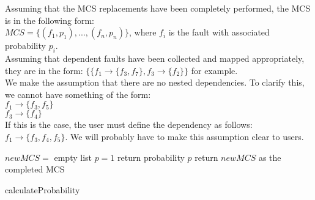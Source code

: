 Assuming that the MCS replacements have been completely performed, the MCS is in the following form: \\

$MCS = \{(f_1,p_1), ...,(f_n,p_n)\}$, where $f_i$ is the fault with associated probability $p_i$. \\

Assuming that dependent faults have been collected and mapped appropriately, they are in the form: $\{\{f_1 \rightarrow\{f_3, f_7\}, f_3 \rightarrow\{f_2\}\}$ for example. \\

We make the assumption that there are no nested dependencies. To clarify this, we cannot have something of the form: \\

$f_1 \rightarrow \{f_3, f_5\}$\\
$f_3 \rightarrow \{f_4\}$\\

If this is the case, the user must define the dependency as follows: $f_1 \rightarrow \{f_3, f_4, f_5\}$. We will probably have to make this assumption clear to users.\\ 

\begin{algorithm}[H]
	$newMCS =$ empty list \;
	$p=1$ \;
	return probability $p$ \;
	return $newMCS$ as the completed MCS \;
	\caption{calculateProbability}
	\label{alg:repl_alg}
\end{algorithm}

































